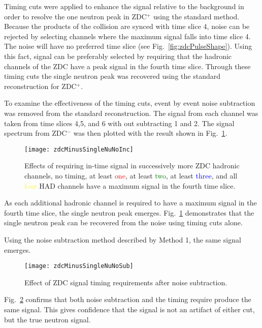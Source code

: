       Timing cuts were applied to enhance the signal relative to the background
        in order to resolve the one neutron peak in ZDC$^{+}$ using the 
        standard method. 
      Because the products of the collision are synced with time slice 4, noise
        can be rejected by selecting channels where the maximum signal falls 
        into time slice 4.
      The noise will have no preferred time slice (see Fig.~\ref{fig:zdcPulseShape}). 
      Using this fact, signal can be preferably selected by requiring that the
        hadronic channels of the ZDC have a peak signal in the fourth time 
        slice.
      Through these timing cuts the single neutron peak was recovered using the
       standard reconstruction for ZDC$^{+}$.

      To examine the effectiveness of the timing cuts, event by event noise 
        subtraction was removed from the standard reconstruction.
      The signal from each channel was taken from time slices 4,5, and 6 with
        out subtracting 1 and 2.
      The signal spectrum from ZDC$^{-}$ was then plotted with the result
        shown in Fig.~\ref{fig:zdcTimingCuts}.
      \begin{figure}[!Hhbt]
        \centering
        \texttt{[image: zdcMinusSingleNuNoInc]}
        \caption{Effects of requiring in-time signal in successively more 
          ZDC hadronic channels, no timing, at least \textcolor{red}{one}, at least \textcolor{green}{two},
            at least \textcolor{blue}{three}, and all \textcolor{yellow}{four} HAD channels have a maximum signal
            in the fourth time slice.}
        \label{fig:zdcTimingCuts}
      \end{figure}
      As each additional hadronic channel is required to have a maximum signal
        in the fourth time slice, the single neutron peak emerges. 
      Fig.~\ref{fig:zdcTimingCuts} demonstrates that the single neutron peak 
        can be recovered from the noise using timing cuts alone. 

      Using the noise subtraction method described by Method 1, the same signal
        emerges.
       \begin{figure}[h]
        \centering
        \texttt{[image: zdcMinusSingleNuNoSub]}
        \caption{Effect of ZDC signal timing requirements after noise 
          subtraction.}
        \label{fig:zdcTimingAfterNoiseSub}
      \end{figure}
      Fig.~\ref{fig:zdcTimingAfterNoiseSub} confirms that both noise 
        subtraction and the timing require produce the same signal.
      This gives confidence that the signal is not an artifact of either cut, 
        but the true neutron signal.

